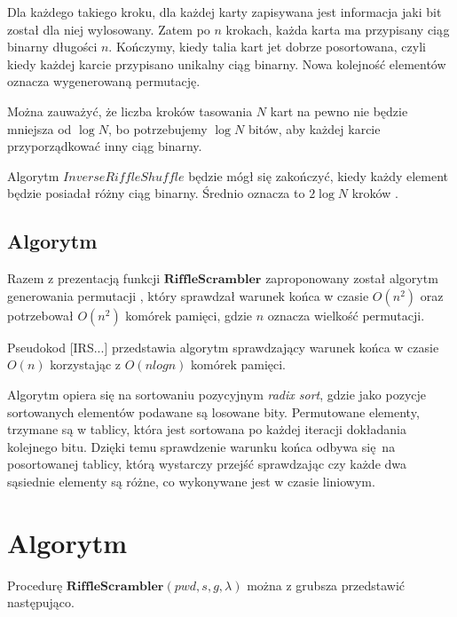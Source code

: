 Dla każdego takiego kroku, dla każdej karty zapisywana jest informacja jaki bit został dla niej wylosowany. Zatem po $n$ krokach, każda karta ma przypisany ciąg binarny długości $n$.
Kończymy, kiedy talia kart jet dobrze posortowana, czyli kiedy każdej karcie przypisano unikalny ciąg binarny. Nowa kolejność elementów oznacza wygenerowaną permutację.

Można zauważyć, że liczba kroków tasowania $N$ kart na pewno nie będzie mniejsza od $\log{N}$, bo potrzebujemy $\log{N}$ bitów, aby każdej karcie przyporządkować inny ciąg binarny.

Algorytm $InverseRiffleShuffle$ będzie mógł się zakończyć, kiedy każdy element będzie posiadał różny ciąg binarny. Średnio oznacza to $2 \log{N}$ kroków \cite{rs}.

\subsection{Algorytm}
Razem z prezentacją funkcji $\mathbf{RiffleScrambler}$ zaproponowany został algorytm generowania permutacji \cite[algorym 1]{rs}, który sprawdzał warunek końca w czasie $O(n^2)$ oraz potrzebował $O(n^2)$ komórek pamięci, gdzie $n$ oznacza wielkość permutacji.

Pseudokod [IRS...] przedstawia algorytm sprawdzający warunek końca w czasie $O(n)$ korzystając z $O(n log{n})$ komórek pamięci.

Algorytm opiera się na sortowaniu pozycyjnym \textit{radix sort}, gdzie jako pozycje sortowanych elementów podawane są losowane bity.
Permutowane elementy, trzymane są w tablicy, która jest sortowana po każdej iteracji dokładania kolejnego bitu. Dzięki temu sprawdzenie warunku końca odbywa się na posortowanej tablicy, którą wystarczy przejść sprawdzając czy każde dwa sąsiednie elementy są różne, co wykonywane jest w czasie liniowym.

\section{Algorytm}

Procedurę $\mathbf{RiffleScrambler}(pwd, s, g,\lambda)$ można z grubsza przedstawić następująco.

